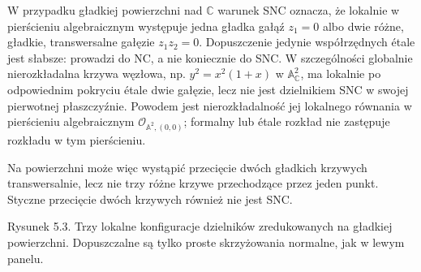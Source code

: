 \documentclass[11pt,a4paper,openany]{report}
\numberwithin{equation}{section}
\theoremstyle{plain}
\theoremstyle{definition}
\theoremstyle{remark}
\newcommand{\C}{\mathbb C}
\newcommand{\A}{\mathbb A}
\begin{document}
W przypadku gładkiej powierzchni nad $\C$ warunek SNC
oznacza, że lokalnie w pierścieniu algebraicznym występuje
jedna gładka gałąź $z_1=0$ albo dwie różne, gładkie,
transwersalne gałęzie $z_1z_2=0$. Dopuszczenie jedynie
współrzędnych étale jest słabsze: prowadzi do NC, a nie
koniecznie do SNC. W szczególności globalnie nierozkładalna
krzywa węzłowa, np. $y^2=x^2(1+x)$ w $\A^2_{\C}$,
ma lokalnie po odpowiednim pokryciu étale dwie gałęzie,
lecz nie jest dzielnikiem SNC w swojej pierwotnej
płaszczyźnie. Powodem jest nierozkładalność jej lokalnego
równania w pierścieniu algebraicznym
$\mathcal O_{\A^2,(0,0)}$; formalny lub étale rozkład
nie zastępuje rozkładu w tym pierścieniu.

Na powierzchni może więc wystąpić przecięcie dwóch
gładkich krzywych transwersalnie, lecz nie trzy różne
krzywe przechodzące przez jeden punkt. Styczne
przecięcie dwóch krzywych również nie jest SNC.

\begin{center}

{\small Rysunek 5.3. Trzy lokalne konfiguracje dzielników zredukowanych na gładkiej powierzchni. Dopuszczalne są tylko proste skrzyżowania normalne, jak w lewym panelu.}\par
\end{center}
\end{document}
